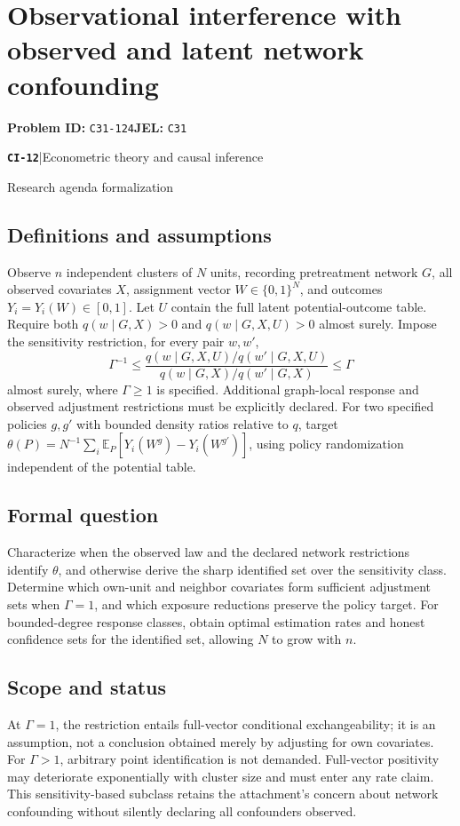 \documentclass[11pt,a4paper]{article}
\newcommand{\E}{\mathbb E}
\newcommand{\entrymeta}[3]{{\sffamily\small\color{muted}\textbf{\texttt{#1}}\quad|\quad #2\par #3\par}}
\begin{document}
\section*{Observational interference with observed and latent network confounding}
\textbf{Problem ID:} \texttt{C31-124}\quad \textbf{JEL:} \texttt{C31}\par
\label{problem:OP-0491}
\label{beyond:CI-12}
\entrymeta{CI-12}{Econometric theory and causal inference}{Research agenda formalization}
\subsection*{Definitions and assumptions}
Observe $n$ independent clusters of $N$ units, recording pretreatment network $G$, all observed covariates $X$, assignment vector $W\in\{0,1\}^N$, and outcomes $Y_i=Y_i(W)\in[0,1]$. Let $U$ contain the full latent potential-outcome table. Require both $q(w\mid G,X)>0$ and $q(w\mid G,X,U)>0$ almost surely. Impose the sensitivity restriction, for every pair $w,w'$,
\[
\Gamma^{-1}\leq
\frac{q(w\mid G,X,U)/q(w'\mid G,X,U)}
     {q(w\mid G,X)/q(w'\mid G,X)}
\leq\Gamma
\]
almost surely, where $\Gamma\geq1$ is specified. Additional graph-local response and observed adjustment restrictions must be explicitly declared. For two specified policies $g,g'$ with bounded density ratios relative to $q$, target
$\theta(P)=N^{-1}\sum_i\E_P[Y_i(W^g)-Y_i(W^{g'})]$,
using policy randomization independent of the potential table.
\subsection*{Formal question}
Characterize when the observed law and the declared network restrictions identify $\theta$, and otherwise derive the sharp identified set over the sensitivity class. Determine which own-unit and neighbor covariates form sufficient adjustment sets when $\Gamma=1$, and which exposure reductions preserve the policy target. For bounded-degree response classes, obtain optimal estimation rates and honest confidence sets for the identified set, allowing $N$ to grow with $n$.
\subsection*{Scope and status}
At $\Gamma=1$, the restriction entails full-vector conditional exchangeability; it is an assumption, not a conclusion obtained merely by adjusting for own covariates. For $\Gamma>1$, arbitrary point identification is not demanded. Full-vector positivity may deteriorate exponentially with cluster size and must enter any rate claim. This sensitivity-based subclass retains the attachment's concern about network confounding without silently declaring all confounders observed.
\end{document}
